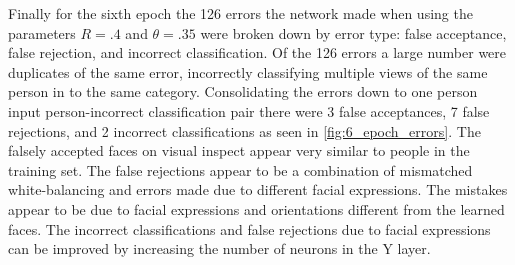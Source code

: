 \documentclass[conference]{IEEEtran}
\begin{document}
Finally for the sixth epoch the 126 errors the network made when using the parameters $R=.4$ and $\theta=.35$ were broken down by error type: false acceptance, false rejection, and incorrect classification. Of the 126 errors a large number were duplicates of the same error, incorrectly classifying multiple views of the same person in to the same category.  Consolidating the errors down to one person input person-incorrect classification pair there were 3 false acceptances, 7 false rejections, and 2 incorrect classifications as seen in \ref{fig:6_epoch_errors}.  The falsely accepted faces on visual inspect appear very similar to people in the training set.  The false rejections appear to be a combination of mismatched white-balancing and errors made due to different facial expressions.  The mistakes appear to be due to facial expressions and orientations different from the learned faces.  The incorrect classifications and false rejections due to facial expressions can be improved by increasing the number of neurons in the Y layer.
\end{document}
